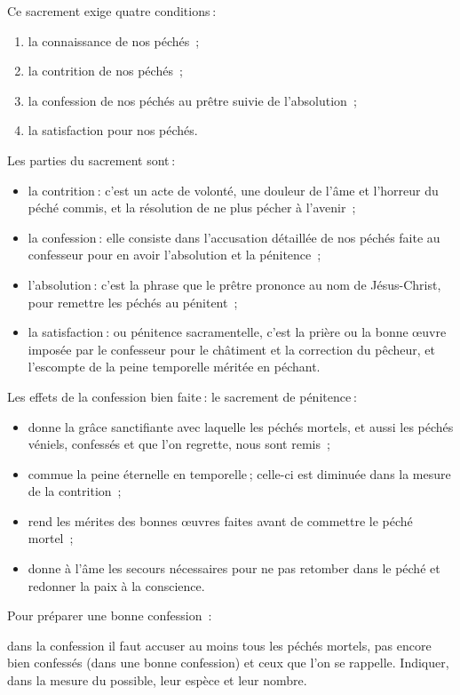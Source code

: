 \documentclass[%
a5paper%
,11pt%
,DIV=15%
,titlepage=on%
,headings=optiontoheadandtoc%
,headings=small%
,parskip=false%
,openany%
]{scrbook}
\begin{document}
Ce sacrement exige quatre conditions :
\begin{enumerate}
\item la connaissance de nos péchés ;
\item la contrition de nos péchés ;
\item la confession de nos péchés au prêtre suivie de l’absolution ;
\item la satisfaction pour nos péchés.
\end{enumerate}

Les parties du sacrement sont :
\begin{itemize}
\item la contrition : c’est un acte de volonté, une douleur de l’âme et l’horreur du péché commis, et la résolution de ne plus pécher à l’avenir ;
\item la confession : elle consiste dans l’accusation détaillée de nos péchés faite au confesseur pour en avoir l’absolution et la pénitence ;
\item l'absolution : c’est la phrase que le prêtre prononce au nom de Jésus-Christ, pour remettre les péchés au pénitent ;
\item la satisfaction : ou pénitence sacramentelle, c’est la prière ou la bonne œuvre imposée par le confesseur pour le châtiment et la correction du pêcheur, et l’escompte de la peine temporelle méritée en péchant.
\end{itemize}

Les effets de la confession bien faite : le sacrement de pénitence :
\begin{itemize}
\item donne la grâce sanctifiante avec laquelle les péchés mortels, et aussi les péchés véniels, confessés et que l'on regrette, nous sont remis ;
\item commue la peine éternelle en temporelle ; celle-ci est diminuée dans la mesure de la contrition ;
\item rend les mérites des bonnes œuvres faites avant de commettre le péché
mortel ;
\item donne à l’âme les secours nécessaires pour ne pas retomber dans le péché et redonner la paix à la conscience.
\end{itemize}

Pour préparer une bonne confession :

dans la confession il faut accuser au moins tous les péchés mortels, pas encore bien confessés (dans une bonne confession) et ceux que l’on se rappelle. Indiquer, dans la mesure du possible, leur espèce et leur nombre.
\end{document}
